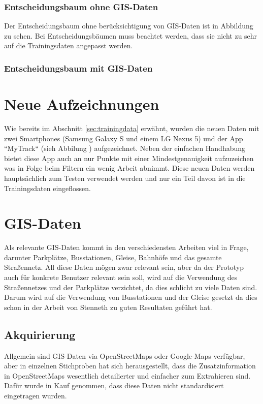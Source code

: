 \subsubsection{Entscheidungsbaum ohne GIS-Daten}
Der Entscheidungsbaum ohne berücksichtigung von GIS-Daten ist in Abbildung  zu sehen. Bei Entscheidungsbäumen muss beachtet werden, dass sie nicht zu sehr auf die Trainingsdaten angepasst werden.


\subsubsection{Entscheidungsbaum mit GIS-Daten}


\section{Neue Aufzeichnungen}
Wie bereits im Abschnitt \ref{sec:trainingdata} erwähnt, wurden die neuen Daten mit zwei Smartphones (Samsung Galaxy S und einem LG Nexus 5) und der App ``MyTrack`` (sieh Abbilung ) aufgezeichnet. Neben der einfachen Handhabung bietet diese App auch an nur Punkte mit einer Mindestgenauigkeit aufzuzeichen was in Folge beim Filtern ein wenig Arbeit abnimmt. Diese neuen Daten werden hauptsächlich zum Testen verwendet werden und nur ein Teil davon ist in die Trainingsdaten eingeflossen.


\section{GIS-Daten}
Als relevante GIS-Daten kommt in den verschiedensten Arbeiten viel in Frage, darunter Parkplätze, Busstationen, Gleise, Bahnhöfe und das gesamte Straßennetz. All diese Daten mögen zwar relevant sein, aber da der Prototyp auch für konkrete Benutzer relevant sein soll, wird auf die Verwendung des Straßennetzes und der Parkplätze verzichtet, da dies schlicht zu viele Daten sind. Darum wird auf die Verwendung von Busstationen und der Gleise gesetzt da dies schon in der Arbeit von Stenneth \cite{stenneth_transportation_2011} zu guten Resultaten geführt hat.

\subsection{Akquirierung}
Allgemein sind GIS-Daten via OpenStreetMaps oder Google-Maps verfügbar, aber in einzelnen Stichproben hat sich herausgestellt, dass die Zusatzinformation in OpenStreetMaps wesentlich detailierter und einfacher zum Extrahieren sind. Dafür wurde in Kauf genommen, dass diese Daten nicht standardisiert eingetragen wurden.


